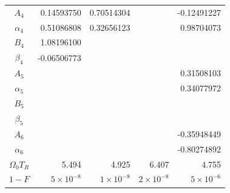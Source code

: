 \documentclass[11pt]{article}
\begin{document}
\begin{table}[htbp]
{\begin{tabular}{c|r|r|r|r}
        $A_4$               & 0.14593750  & 0.70514304  &             & -0.12491227 \\
        $\alpha_4$          & 0.51086808  & 0.32656123  &             & 0.98704073  \\
        $B_4$               & 1.08196100  &             &             & \\
        $\beta_4$           & -0.06506773 &             &             & \\
        $A_5$               &             &             &             & 0.31508103  \\
        $\alpha_5$          &             &             &             & 0.34077972  \\
        $B_5$               &             &             &             & \\
        $\beta_5$           &             &             &             & \\
        $A_6$               &             &             &             & -0.35948449 \\
        $\alpha_6$          &             &             &             & -0.80274892 \\ \hline
        $\Omega_0 T_R$      & 5.494       & 4.925       & 6.407       & 4.755       \\
        $1-F$               & $5\times10^{-8}$ & $1\times10^{-8}$ & $2\times10^{-8}$ & $5\times10^{-6}$ \\ \hline \hline
    \end{tabular}
}
\end{table}
\end{document}
